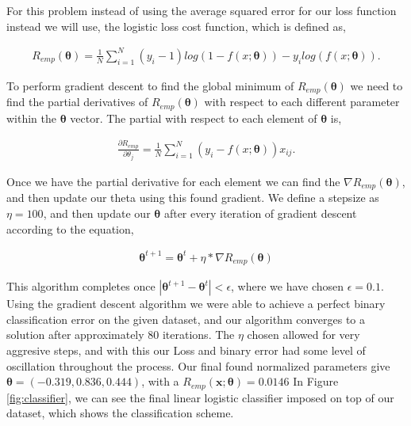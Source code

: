 \documentclass[paper=a4, fontsize=11pt]{scrartcl} %
\begin{document}
For this problem instead of using the average squared error for our loss function instead we will use, the logistic loss cost function, which is defined as, 

\begin{align}
R_{emp}(\bm{\theta}) = \frac{1}{N}\sum\limits_{i=1}^N(y_{i}-1)log(1-f(x;\bm{\theta})) - y_{i}log(f(x;\bm{\theta})).
\end{align}

To perform gradient descent to find the global minimum of $R_{emp}(\bm{\theta})$ we need to find the partial derivatives of $R_{emp}(\bm{\theta})$ with respect to each different parameter within the $\bm{\theta}$ vector.  The partial with respect to each element of $\bm{\theta}$ is,

\begin{align}
\frac{\partial R_{emp}}{\partial \theta_{j}} = \frac{1}{N}\sum\limits_{i=1}^N(y_{i}-f(x;\bm{\theta}))x_{ij}.
\end{align}

Once we have the partial derivative for each element we can find the $\nabla R_{emp}(\bm{\theta})$, and then update our theta using this found gradient. 
We define a stepsize as $\eta = 100$, and then update our $\bm{\theta}$ after every iteration of gradient descent according to the equation,

\begin{align}
\bm{\theta} ^{t+1} = \bm{\theta} ^t + \eta*\nabla R_{emp}(\bm{\theta})
\end{align}

This algorithm completes once $| \bm{\theta} ^{t+1} -  \bm{\theta} ^t| < \epsilon$, where we have chosen $\epsilon = 0.1$. 
Using the gradient descent algorithm we were able to achieve a perfect binary classification error on the given dataset, and our algorithm converges to a solution after approximately 80 iterations.
The $\eta$ chosen allowed for very aggresive steps, and with this our Loss and binary error had some level of oscillation throughout the process.
Our final found normalized parameters give $\bm{\theta}  = (-0.319, 0.836, 0.444)$, with a $R_{emp}(\bm{x};\bm{\theta}) = 0.0146$ 
In Figure \ref{fig:classifier}, we can see the  final linear logistic classifier imposed on top of our dataset, which shows the classification scheme.
\end{document}
